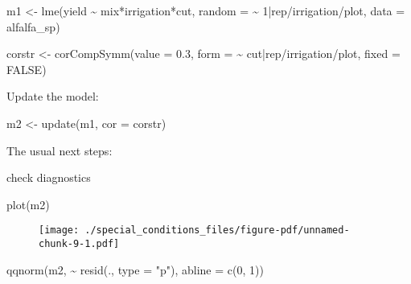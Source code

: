 \documentclass[
  letterpaper,
  DIV=11,
  numbers=noendperiod]{scrreprt}
\newenvironment{Shaded}{\begin{snugshade}}{\end{snugshade}}
\newcommand{\AttributeTok}[1]{\textcolor[rgb]{0.40,0.45,0.13}{#1}}
\newcommand{\ConstantTok}[1]{\textcolor[rgb]{0.56,0.35,0.01}{#1}}
\newcommand{\DecValTok}[1]{\textcolor[rgb]{0.68,0.00,0.00}{#1}}
\newcommand{\FloatTok}[1]{\textcolor[rgb]{0.68,0.00,0.00}{#1}}
\newcommand{\FunctionTok}[1]{\textcolor[rgb]{0.28,0.35,0.67}{#1}}
\newcommand{\NormalTok}[1]{\textcolor[rgb]{0.00,0.23,0.31}{#1}}
\newcommand{\OtherTok}[1]{\textcolor[rgb]{0.00,0.23,0.31}{#1}}
\newcommand{\SpecialCharTok}[1]{\textcolor[rgb]{0.37,0.37,0.37}{#1}}
\newcommand{\StringTok}[1]{\textcolor[rgb]{0.13,0.47,0.30}{#1}}
\begin{document}
\begin{Shaded}
\begin{Highlighting}[numbers=left,,]
\NormalTok{m1 }\OtherTok{\textless{}{-}} \FunctionTok{lme}\NormalTok{(yield }\SpecialCharTok{\textasciitilde{}}\NormalTok{ mix}\SpecialCharTok{*}\NormalTok{irrigation}\SpecialCharTok{*}\NormalTok{cut,}
          \AttributeTok{random =} \SpecialCharTok{\textasciitilde{}} \DecValTok{1}\SpecialCharTok{|}\NormalTok{rep}\SpecialCharTok{/}\NormalTok{irrigation}\SpecialCharTok{/}\NormalTok{plot,}
          \AttributeTok{data =}\NormalTok{ alfalfa\_sp)}

\NormalTok{corstr }\OtherTok{\textless{}{-}} \FunctionTok{corCompSymm}\NormalTok{(}\AttributeTok{value =} \FloatTok{0.3}\NormalTok{, }
                      \AttributeTok{form =} \SpecialCharTok{\textasciitilde{}}\NormalTok{ cut}\SpecialCharTok{|}\NormalTok{rep}\SpecialCharTok{/}\NormalTok{irrigation}\SpecialCharTok{/}\NormalTok{plot,}
                      \AttributeTok{fixed =} \ConstantTok{FALSE}\NormalTok{)}
\end{Highlighting}
\end{Shaded}

Update the model:

\begin{Shaded}
\begin{Highlighting}[]
\NormalTok{m2 }\OtherTok{\textless{}{-}} \FunctionTok{update}\NormalTok{(m1, }\AttributeTok{cor =}\NormalTok{ corstr)}
\end{Highlighting}
\end{Shaded}

The usual next steps:

check diagnostics

\begin{Shaded}
\begin{Highlighting}[]
\FunctionTok{plot}\NormalTok{(m2)}
\end{Highlighting}
\end{Shaded}

\begin{figure}[H]

{\centering \texttt{[image: ./special\_conditions\_files/figure-pdf/unnamed-chunk-9-1.pdf]}

}

\end{figure}

\begin{Shaded}
\begin{Highlighting}[]
\FunctionTok{qqnorm}\NormalTok{(m2, }\SpecialCharTok{\textasciitilde{}} \FunctionTok{resid}\NormalTok{(., }\AttributeTok{type =} \StringTok{"p"}\NormalTok{), }\AttributeTok{abline =} \FunctionTok{c}\NormalTok{(}\DecValTok{0}\NormalTok{, }\DecValTok{1}\NormalTok{))}
\end{Highlighting}
\end{Shaded}
\end{document}
